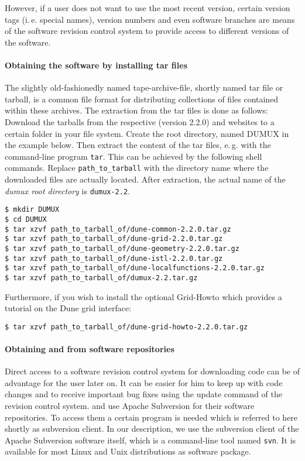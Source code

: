 However, if a user does not want to use the most recent version,
certain version tags (i.\,e. special names), version numbers and even software branches are means 
of the software revision control system to provide access to different versions of the software.

\paragraph{Obtaining the software by installing tar files}
The slightly old-fashionedly named tape-archive-file, shortly named tar file or tarball, is a common file format for distributing collections of files contained within these archives.
The extraction from the tar files is done as follows: 
Download the tarballs from the respective \Dune (version 2.2.0) and \Dumux websites to a certain folder in your file system.
Create the {\Dune} root directory, named DUMUX in the example below. Then extract the content of the tar files, e.\,g. with the command-line program \texttt{tar}.
This can be achieved by the following shell commands. Replace \texttt{path\_to\_tarball} with the directory name where the downloaded files are actually located.
After extraction, the actual name of the \emph{dumux root directory} is \texttt{dumux-2.2}. 

\begin{lstlisting}[style=Bash]
$ mkdir DUMUX
$ cd DUMUX
$ tar xzvf path_to_tarball_of/dune-common-2.2.0.tar.gz 
$ tar xzvf path_to_tarball_of/dune-grid-2.2.0.tar.gz 
$ tar xzvf path_to_tarball_of/dune-geometry-2.2.0.tar.gz 
$ tar xzvf path_to_tarball_of/dune-istl-2.2.0.tar.gz 
$ tar xzvf path_to_tarball_of/dune-localfunctions-2.2.0.tar.gz 
$ tar xzvf path_to_tarball_of/dumux-2.2.tar.gz
\end{lstlisting}

Furthermore, if you wish to install the optional \Dune Grid-Howto which provides a tutorial on the Dune grid interface:

\begin{lstlisting}[style=Bash]
$ tar xzvf path_to_tarball_of/dune-grid-howto-2.2.0.tar.gz
\end{lstlisting}

\paragraph{Obtaining \Dune and \Dumux from software repositories} 

Direct access to a software revision control system for downloading code can be of advantage for the user later on. 
It can be easier for him to keep up with code changes and to receive important bug fixes using the update command of the revision control system. 
\Dune and \Dumux use Apache Subversion for their software repositories. To access them a certain program is needed which is referred to here shortly as subversion client. 
In our description, we use the subversion client of the Apache Subversion software itself, which is a command-line tool named \texttt{svn}. 
It is available for most Linux and Unix distributions as software package.

